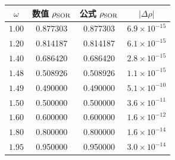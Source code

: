 \begin{tabular}{cccc}
\toprule
$\omega$ & 数值 $\rho_{\rm SOR}$ & 公式 $\rho_{\rm SOR}$ & $|\Delta\rho|$ \\
\midrule
$1.00$ & 0.877303 & 0.877303 & $6.9\times10^{-15}$ \\
$1.20$ & 0.814187 & 0.814187 & $6.1\times10^{-15}$ \\
$1.40$ & 0.686420 & 0.686420 & $2.8\times10^{-15}$ \\
$1.48$ & 0.508926 & 0.508926 & $1.1\times10^{-15}$ \\
$1.49$ & 0.490000 & 0.490000 & $5.1\times10^{-10}$ \\
$1.50$ & 0.500000 & 0.500000 & $3.6\times10^{-11}$ \\
$1.60$ & 0.600000 & 0.600000 & $1.6\times10^{-12}$ \\
$1.80$ & 0.800000 & 0.800000 & $1.6\times10^{-14}$ \\
$1.95$ & 0.950000 & 0.950000 & $3.0\times10^{-14}$ \\
\bottomrule
\end{tabular}
